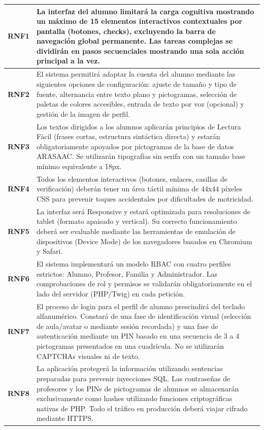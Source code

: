 \begin{table}[H]
\begin{tabularx}{\textwidth}{|p{2.2cm}|X|}
\textbf{RNF1} & La interfaz del alumno limitará la carga cognitiva mostrando un máximo de 15 elementos interactivos contextuales por pantalla (botones, checks), excluyendo la barra de navegación global permanente. Las tareas complejas se dividirán en pasos secuenciales mostrando una sola acción principal a la vez. \\ \hline
\textbf{RNF2} & El sistema permitirá adaptar la cuenta del alumno mediante las siguientes opciones de configuración: ajuste de tamaño y tipo de fuente, alternancia entre texto plano y pictogramas, selección de paletas de colores accesibles, entrada de texto por voz (opcional) y gestión de la imagen de perfil. \\ \hline
\rowcolor{azulclaro}
\textbf{RNF3} & Los textos dirigidos a los alumnos aplicarán principios de Lectura Fácil (frases cortas, estructura sintáctica directa) y estarán obligatoriamente apoyados por pictogramas de la base de datos ARASAAC. Se utilizarán tipografías sin serifa con un tamaño base mínimo equivalente a 18px. \\ \hline
\textbf{RNF4} & Todos los elementos interactivos (botones, enlaces, casillas de verificación) deberán tener un área táctil mínima de 44x44 píxeles CSS para prevenir toques accidentales por dificultades de motricidad. \\ \hline
\rowcolor{azulclaro}
\textbf{RNF5} & La interfaz será Responsive y estará optimizada para resoluciones de tablet (formato apaisado y vertical). Su correcto funcionamiento deberá ser evaluable mediante las herramientas de emulación de dispositivos (Device Mode) de los navegadores basados en Chromium y Safari. \\ \hline
\textbf{RNF6} & El sistema implementará un modelo RBAC con cuatro perfiles estrictos: Alumno, Profesor, Familia y Administrador. Las comprobaciones de rol y permisos se validarán obligatoriamente en el lado del servidor (PHP/Twig) en cada petición. \\ \hline
\rowcolor{azulclaro}
\textbf{RNF7} & El proceso de login para el perfil de alumno prescindirá del teclado alfanumérico. Constará de una fase de identificación visual (selección de aula/avatar o mediante sesión recordada) y una fase de autenticación mediante un PIN basado en una secuencia de 3 a 4 pictogramas presentados en una cuadrícula. No se utilizarán CAPTCHAs visuales ni de texto. \\ \hline
\textbf{RNF8} & La aplicación protegerá la información utilizando sentencias preparadas para prevenir inyecciones SQL. Las contraseñas de profesores y los PINs de pictogramas de alumnos se almacenarán exclusivamente como hashes utilizando funciones criptográficas nativas de PHP. Todo el tráfico en producción deberá viajar cifrado mediante HTTPS. \\ \hline

\end{tabularx}
\end{table}
